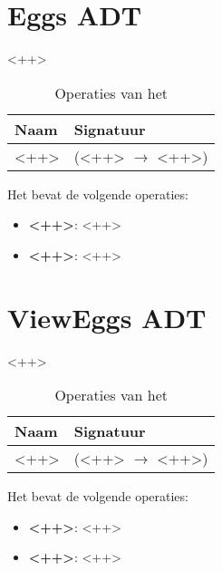 \section{Eggs ADT}
\label{section:eggs}

<++>

\begin{table}[hbt]
\centering
\begin{tabular}{|ll|}
\hline
\rowcolor[HTML]{000000} 
{\color[HTML]{FFFFFF} \textbf{Naam}} & {\color[HTML]{FFFFFF} \textbf{Signatuur}} \\ \hline
<++>                                 & (<++> $\rightarrow$ <++>)                                       \\ \hline
\end{tabular}
\caption{Operaties van het \texttt{}}
\label{table:eggs}
\end{table}

Het \texttt{} bevat de volgende operaties:

\begin{itemize}
	\item \textbf{<++>}: <++>
	\item \textbf{<++>}: <++>
\end{itemize}

\section{View\textunderscore Eggs ADT}
\label{section:view_eggs}

<++>

\begin{table}[hbt]
\centering
\begin{tabular}{|ll|}
\hline
\rowcolor[HTML]{000000} 
{\color[HTML]{FFFFFF} \textbf{Naam}} & {\color[HTML]{FFFFFF} \textbf{Signatuur}} \\ \hline
<++>                                 & (<++> $\rightarrow$ <++>)                                       \\ \hline
\end{tabular}
\caption{Operaties van het \texttt{}}
\label{table:view_eggs}
\end{table}

Het \texttt{} bevat de volgende operaties:

\begin{itemize}
	\item \textbf{<++>}: <++>
	\item \textbf{<++>}: <++>
\end{itemize}

